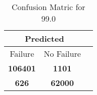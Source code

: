 \begin{table}[] 
\label{Table: Prediction Accuracy-DMD99.0OnlySunEKF-combinationReflection-Reflection} 
\caption{Confusion Matric for 99.0} 
\centering 
\begin{tabular} 
 {@{}ccc@{}} 
\toprule 
\multicolumn{2}{c}{\textbf{Predicted}}
 \\ \midrule 
\multicolumn{1}{|c|}{Failure} & 
\multicolumn{1}{c|}{No Failure}
 \\ \midrule 
\multicolumn{1}{|c|}{\color{green}\textbf{106401}} & 
\multicolumn{1}{c|}{\color{red}\textbf{1101}}
 \\ \midrule 
\multicolumn{1}{|c|}{\color{red}\textbf{626}} & 
\multicolumn{1}{c|}{\color{green}\textbf{62000}}
 \\ \bottomrule 
\end{tabular} 
\end{table} 
